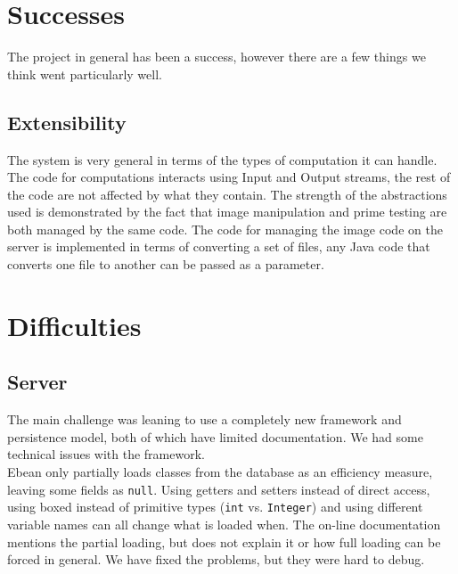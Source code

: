 \documentclass[a4paper,10pt]{article}
\begin{document}
\section{Successes}

The project in general has been a success, however there are a few things we think went particularly well.

\subsection{Extensibility}

The system is very general in terms of the types of computation it can handle.
The code for computations interacts using Input and Output streams, the rest of the code are not affected by what they contain.
The strength of the abstractions used is demonstrated by the fact that image manipulation and prime testing are both managed by the same code.
The code for managing the image code on the server is implemented in terms of converting a set of files, any Java code that converts one file to another can be passed as a parameter.




\section{Difficulties}

\subsection{Server}

The main challenge was leaning to use a completely new framework and persistence model, both of which have limited documentation.
We had some technical issues with the framework.\\

Ebean only partially loads classes from the database as an efficiency measure, leaving some fields as \texttt{null}.
Using getters and setters instead of direct access, using boxed instead of primitive types (\texttt{int} vs. \texttt{Integer}) and using different variable names
can all change what is loaded when. The on-line documentation mentions the partial loading, but does not explain it or how full loading can be forced in general.
We have fixed the problems, but they were hard to debug.\\
\end{document}
